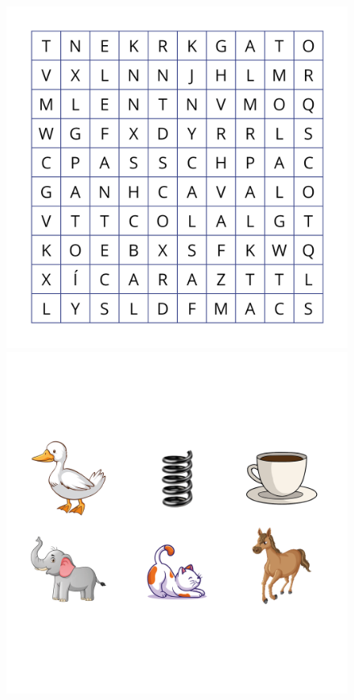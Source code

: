 \begin{figure}[H]
\centering
\includegraphics[width=.85\textwidth]{media/image29.png}

\vspace{1cm}

\includegraphics[width=.8\textwidth]{media/image30a36.png}
\end{figure}



